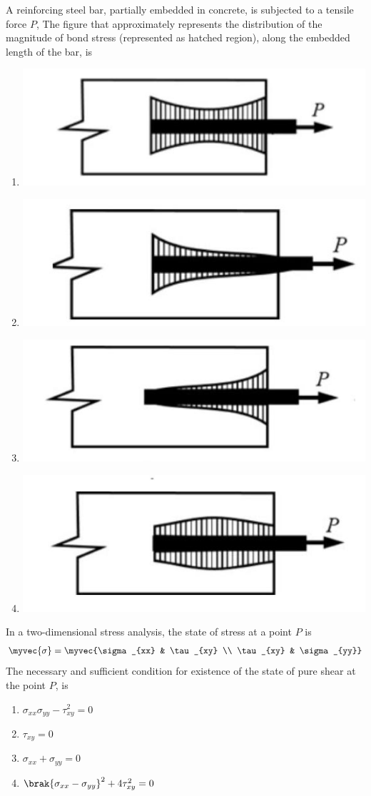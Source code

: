 \item A reinforcing steel bar, partially embedded in concrete, is subjected to a tensile force $P$, The figure that approximately represents the distribution of the magnitude of bond stress (represented as hatched region), along the embedded length of the bar, is
\begin{multicols}{2}
    \begin{enumerate}
        \item \includegraphics[width=0.5\linewidth]{GATE-yearwise/2020/figs/fig_a.png}
        \item \includegraphics[width=0.5\linewidth]{GATE-yearwise/2020/figs/fig_b.png}
        \item \includegraphics[width=0.5\linewidth]{GATE-yearwise/2020/figs/fig_c.png}
        \item \includegraphics[width=0.5\linewidth]{GATE-yearwise/2020/figs/fig_d.png}
    \end{enumerate}
\end{multicols}

\item In a two-dimensional stress analysis, the state of stress at a point $P$ is
\begin{align*}
    \myvec{\sigma} = \myvec{\sigma_{xx} & \tau_{xy} \\ \tau_{xy} & \sigma_{yy}}
\end{align*}
The necessary and sufficient condition for existence of the state of pure shear at the point $P$, is
\begin{multicols}{2}
    \begin{enumerate}
        \item $\sigma_{xx} \sigma_{yy} - \tau^2_{xy} = 0$
        \item $\tau_{xy} = 0$
        \item $\sigma_{xx} + \sigma_{yy} = 0$
        \item $\brak{\sigma_{xx} - \sigma_{yy}}^2 + 4 \tau^2_{xy} = 0$
    \end{enumerate}
\end{multicols}

